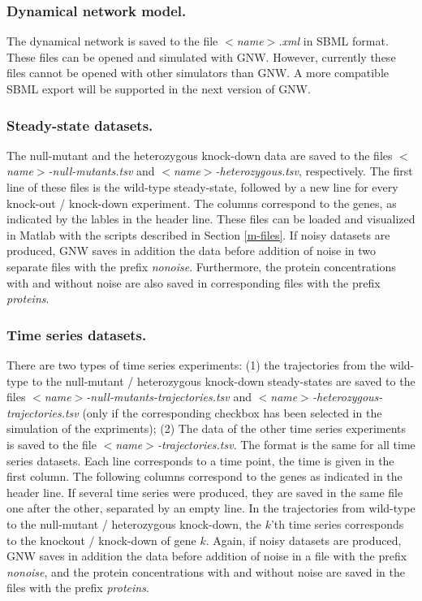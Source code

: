 \documentclass{llncs}
\begin{document}
\subsubsection{Dynamical network model.}
The dynamical network is saved to the file \emph{ $<$name$>$.xml} in SBML format. These files can be opened and simulated with GNW. However, currently these files cannot be opened with other simulators than GNW. A more compatible SBML export will be supported in the next version of GNW.

\subsubsection{Steady-state datasets.}

The null-mutant and the heterozygous knock-down data are saved to the files \emph{ $<$name$>$-null-mutants.tsv} and \emph{ $<$name$>$-heterozygous.tsv}, respectively. The first line of these files is the wild-type steady-state, followed by a new line for every knock-out / knock-down experiment. The columns correspond to the genes, as indicated by the lables in the header line. These files can be loaded and visualized in Matlab with the scripts described in Section \ref{m-files}. If noisy datasets are produced, GNW saves in addition the data before addition of noise in two separate files with the prefix \emph{nonoise}. Furthermore, the protein concentrations with and without noise are also saved in corresponding files with the prefix \emph{proteins}.

\subsubsection{Time series datasets.}
There are two types of time series experiments: (1) the trajectories from the wild-type to the null-mutant / heterozygous knock-down steady-states are saved to the files \emph{$<$name$>$-null-mutants-trajectories.tsv} and \emph{$<$name$>$-heterozygous-trajectories.tsv} (only if the corresponding checkbox has been selected in the simulation of the expriments); (2) The data of the other time series experiments is saved to the file \emph{ $<$name$>$-trajectories.tsv}. The format is the same for all time series datasets. Each line corresponds to a time point, the time is given in the first column. The following columns correspond to the genes as indicated in the header line. If several time series were produced, they are saved in the same file one after the other, separated by an empty line. In the trajectories from wild-type to the null-mutant / heterozygous knock-down, the $k$'th time series corresponds to the knockout / knock-down of gene $k$. Again, if noisy datasets are produced, GNW saves in addition the data before addition of noise in a file with the prefix \emph{nonoise}, and the protein concentrations with and without noise are saved in the files with the prefix \emph{proteins}.\\
\end{document}
